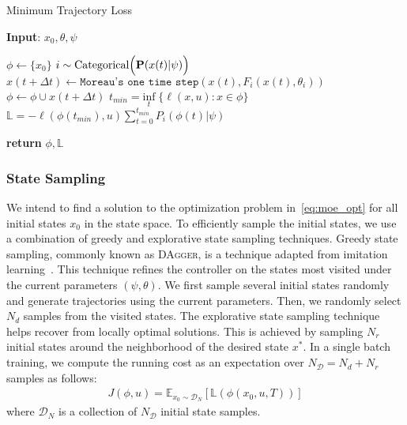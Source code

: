 \begin{enumerate}
    \begin{algorithm}[H]
        \caption{Minimum Trajectory Loss}
        \label{algo:mtl}
        \small
        \hspace*{\algorithmicindent} \textbf{Input}: $x_0, \theta, \psi$
        \begin{algorithmic}[1]
            \State $\phi \leftarrow \{x_0\}$
                    \State $i \sim \text{Categorical}\Bigl(\mathbf{P}(x(t)| \psi)\Bigr)$ 
                    \State $x(t + \Delta t) \leftarrow \texttt{Moreau's one time step}(x(t), F_i(x(t), \theta_i))$
                    \State $\phi \leftarrow \phi \cup x(t + \Delta t)$
                \EndFor
                \State $t_{min} = \underset{t}{\textrm{inf}} \; \{ \ell(x, u): x \in \phi\}$
                \State $\mathbb{L} = - \ell(\phi(t_{min}), u) \sum_{t=0}^{t_{min}}P_i(\phi(t) | \psi)  $

            \State \textbf{return} $\phi, \mathbb{L}$
        \end{algorithmic}
    \end{algorithm}
\end{enumerate}

\subsubsection{State Sampling}
\label{sssec:state_sampling}

We intend to find a solution to the optimization problem
in~\eqref{eq:moe_opt} for all initial states $x_0$ in the
state space.
%
To efficiently sample the initial states, we use a combination of greedy and
explorative state sampling techniques.
%
Greedy state sampling, commonly known as \textsc{DAgger}, is a technique
adapted from imitation learning~\cite{ross2011no}.
%
This technique refines the controller on the states most visited under the
current parameters $(\psi, \theta)$.
%
We first sample several initial states randomly and generate trajectories using
the current parameters.
%
Then, we randomly select $N_d$ samples from the visited states. 
%
The explorative state sampling technique helps recover from locally optimal
solutions. 
%
This is achieved by sampling $N_r$ initial states around the neighborhood of the
desired state $x^*$.
%
In a single batch training, we compute the running cost as an expectation
over $N_{\mathcal{D}} = N_d+N_r$ samples as follows:
\begin{align*}
    J(\phi, u) = \mathbb{E}_{x_0 \sim \mathcal{D}_N}[ \mathbb{L}(\phi(x_0, u, T))]
\end{align*}
\noindent where $\mathcal{D}_N$ is a collection of $N_{\mathcal{D}}$ initial state samples.

